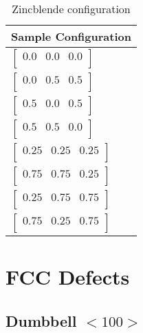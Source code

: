 \renewcommand{\arraystretch}{1.1}
\begin{table}[!htbp]
\begin{tabular}{l}
Sample Configuration\\
\hline
$\begin{bmatrix} 0.0 & 0.0 & 0.0 \\ \end{bmatrix} $ \\
$\begin{bmatrix} 0.0 & 0.5 & 0.5 \\ \end{bmatrix} $ \\
$\begin{bmatrix} 0.5 & 0.0 & 0.5 \\ \end{bmatrix} $ \\
$\begin{bmatrix} 0.5 & 0.5 & 0.0 \\ \end{bmatrix} $ \\
$\begin{bmatrix} 0.25 & 0.25 & 0.25 \\ \end{bmatrix} $ \\
$\begin{bmatrix} 0.75 & 0.75 & 0.25 \\ \end{bmatrix} $ \\
$\begin{bmatrix} 0.25 & 0.75 & 0.75 \\ \end{bmatrix} $ \\
$\begin{bmatrix} 0.75 & 0.25 & 0.75 \\ \end{bmatrix} $ \\
\end{tabular}
\label{tab:Zincblende}
\caption{Zincblende configuration}
\end{table}








\section{FCC Defects}


\subsection{Dumbbell $<100>$}


